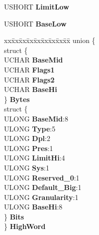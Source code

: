 \begin{DoxyCompactItemize}
\begin{tabbing}
\end{tabbing}\item 
\mbox{\label{struct___l_d_t___e_n_t_r_y_af6786566a71374e5af732ca44e20b5f5}} 
U\+S\+H\+O\+RT {\bfseries Limit\+Low}
\item 
\mbox{\label{struct___l_d_t___e_n_t_r_y_a3297b8d84d3130f24e983f919f4cef8a}} 
U\+S\+H\+O\+RT {\bfseries Base\+Low}
\item 
\mbox{\label{struct___l_d_t___e_n_t_r_y_a71aa1d3dcb351fcc0cb43f45af4bc785}} 
\begin{tabbing}
xx\=xx\=xx\=xx\=xx\=xx\=xx\=xx\=xx\=\kill
union \{\\
\>struct \{\\
\>\>UCHAR {\bfseries BaseMid}\\
\>\>UCHAR {\bfseries Flags1}\\
\>\>UCHAR {\bfseries Flags2}\\
\>\>UCHAR {\bfseries BaseHi}\\
\>\} {\bfseries Bytes}\\
\>struct \{\\
\>\>ULONG {\bfseries BaseMid}:8\\
\>\>ULONG {\bfseries Type}:5\\
\>\>ULONG {\bfseries Dpl}:2\\
\>\>ULONG {\bfseries Pres}:1\\
\>\>ULONG {\bfseries LimitHi}:4\\
\>\>ULONG {\bfseries Sys}:1\\
\>\>ULONG {\bfseries Reserved\_0}:1\\
\>\>ULONG {\bfseries Default\_Big}:1\\
\>\>ULONG {\bfseries Granularity}:1\\
\>\>ULONG {\bfseries BaseHi}:8\\
\>\} {\bfseries Bits}\\
\} {\bfseries HighWord}\\


\end{tabbing}
\end{DoxyCompactItemize}
